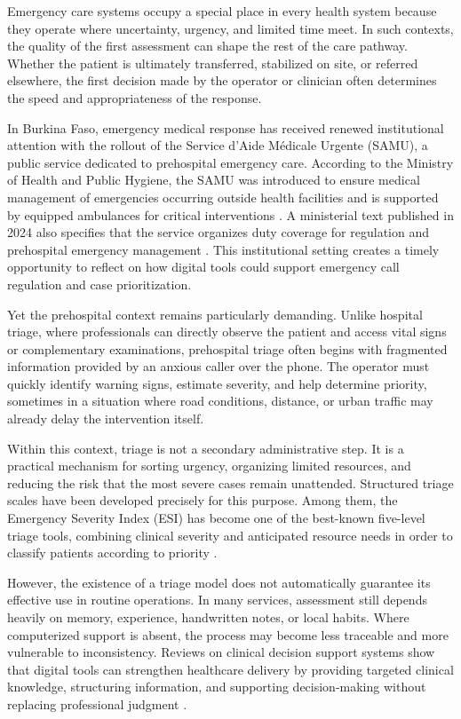 \documentclass[a4paper,12pt,oneside]{report}
\begin{document}
Emergency care systems occupy a special place in every health system because they operate where uncertainty, urgency, and limited time meet. In such contexts, the quality of the first assessment can shape the rest of the care pathway. Whether the patient is ultimately transferred, stabilized on site, or referred elsewhere, the first decision made by the operator or clinician often determines the speed and appropriateness of the response.

In Burkina Faso, emergency medical response has received renewed institutional attention with the rollout of the Service d'Aide M\'edicale Urgente (SAMU), a public service dedicated to prehospital emergency care. According to the Ministry of Health and Public Hygiene, the SAMU was introduced to ensure medical management of emergencies occurring outside health facilities and is supported by equipped ambulances for critical interventions \cite{ministry2024_urgences}. A ministerial text published in 2024 also specifies that the service organizes duty coverage for regulation and prehospital emergency management \cite{ministry2024_garde}. This institutional setting creates a timely opportunity to reflect on how digital tools could support emergency call regulation and case prioritization.

Yet the prehospital context remains particularly demanding. Unlike hospital triage, where professionals can directly observe the patient and access vital signs or complementary examinations, prehospital triage often begins with fragmented information provided by an anxious caller over the phone. The operator must quickly identify warning signs, estimate severity, and help determine priority, sometimes in a situation where road conditions, distance, or urban traffic may already delay the intervention itself.

Within this context, triage is not a secondary administrative step. It is a practical mechanism for sorting urgency, organizing limited resources, and reducing the risk that the most severe cases remain unattended. Structured triage scales have been developed precisely for this purpose. Among them, the Emergency Severity Index (ESI) has become one of the best-known five-level triage tools, combining clinical severity and anticipated resource needs in order to classify patients according to priority \cite{gilboy2011,esi5handbook}.

However, the existence of a triage model does not automatically guarantee its effective use in routine operations. In many services, assessment still depends heavily on memory, experience, handwritten notes, or local habits. Where computerized support is absent, the process may become less traceable and more vulnerable to inconsistency. Reviews on clinical decision support systems show that digital tools can strengthen healthcare delivery by providing targeted clinical knowledge, structuring information, and supporting decision-making without replacing professional judgment \cite{sutton2020,wasylewicz2018,chen2023}.
\end{document}
